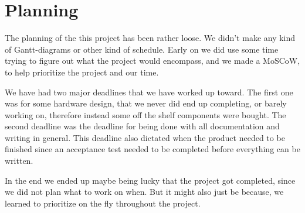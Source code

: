 \chapter{Planning}
The planning of the this project has been rather loose. We didn't make any kind of Gantt-diagrams or other kind of schedule. Early on we did use some time trying to figure out what the project would encompass, and we made a MoSCoW, to help prioritize the project and our time.

We have had two major deadlines that we have worked up toward. The first one was for some hardware design, that we never did end up completing, or barely working on, therefore instead some off the shelf components were bought. The second deadline was the deadline for being done with all documentation and writing in general. This deadline also dictated when the product needed to be finished since an acceptance test needed to be completed before everything can be written. 

In the end we ended up maybe being lucky that the project got completed, since we did not plan what to work on when. But it might also just be because, we learned to prioritize on the fly throughout the project. 